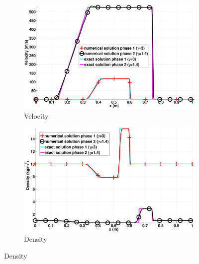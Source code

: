 \documentclass[preprint,10pt]{elsarticle}
\begin{document}
\begin{figure}[H]
        \centering
        \begin{subfigure}[b]{0.495\textwidth}
                \centering
                \includegraphics[width=\textwidth]{figures/two_phases_velocity.eps}
                \caption{Velocity}
                \label{fig:indp-phase-vel}
        \end{subfigure}%
        \begin{subfigure}[b]{0.495\textwidth}
                \centering
                \includegraphics[width=\textwidth]{figures/two_phases_density.eps}
                \caption{Density}
                \label{fig:indp-phase-density}
        \end{subfigure}
        

\end{figure}
\end{document}
